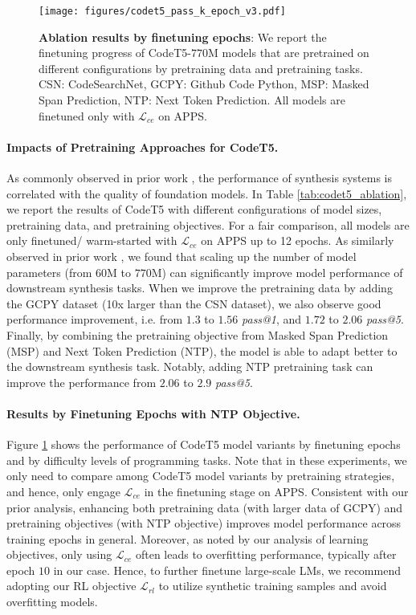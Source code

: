 \documentclass{article}
\begin{document}
\begin{figure}[t]
	\centering
	\resizebox{1.0\textwidth}{!} {
	\texttt{[image: figures/codet5\_pass\_k\_epoch\_v3.pdf]}
	}
	\caption{
	\textbf{Ablation results by finetuning epochs}:
	We report the finetuning progress of CodeT5-$770$M models that are pretrained on different configurations by pretraining data and pretraining tasks. CSN: CodeSearchNet, GCPY: Github Code Python, MSP: Masked Span Prediction, NTP: Next Token Prediction. 
	All models are finetuned only with $\mathcal{L}_{ce}$ on APPS.
	}
	\label{app_fig:codet5_apps}
\end{figure}

\paragraph{Impacts of Pretraining Approaches for CodeT5.}
As commonly observed in prior work \citep{austin2021program, chen2021evaluating, li2022competition}, the performance of synthesis systems is correlated with the quality of foundation models. 
In Table \ref{tab:codet5_ablation}, we report the results of CodeT5 with different configurations of model sizes, pretraining data, and pretraining objectives. 
For a fair comparison, all models are only finetuned/ warm-started with $\mathcal{L}_{ce}$ on APPS up to 12 epochs. 
As similarly observed in prior work \citep{chen2021evaluating, austin2021program}, we found that scaling up the number of model parameters (from $60$M to $770$M) can significantly improve model performance of downstream synthesis tasks. 
When we improve the pretraining data by adding the GCPY dataset (10x larger than the CSN dataset), we also observe good performance improvement, i.e. from $1.3$ to $1.56$ \emph{pass@1}, and $1.72$ to $2.06$ \emph{pass@5}. 
Finally, by combining the pretraining objective from Masked Span Prediction (MSP) and Next Token Prediction (NTP), the model is able to adapt better to the downstream synthesis task.
Notably, adding NTP pretraining task can improve the performance from $2.06$ to $2.9$ \emph{pass@5}. 

\paragraph{Results by Finetuning Epochs with NTP Objective.}
Figure \ref{app_fig:codet5_apps} shows the performance of CodeT5 model variants by finetuning epochs and by difficulty levels of programming tasks. 
Note that in these experiments, we only need to compare among CodeT5 model variants by pretraining strategies, and hence, only engage $\mathcal{L}_{ce}$  in the finetuning stage on APPS. 
Consistent with our prior analysis, enhancing both pretraining data (with larger data of GCPY) and pretraining objectives (with NTP objective) improves model performance across training epochs in general. 
Moreover, as noted by our analysis of learning objectives, only using $\mathcal{L}_{ce}$ often leads to overfitting performance, typically after epoch $10$ in our case.
Hence, to further finetune large-scale LMs, we recommend adopting our RL objective $\mathcal{L}_{rl}$ to utilize synthetic training samples and avoid overfitting models.
\end{document}
